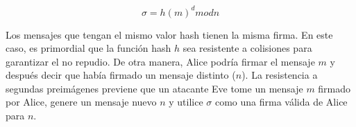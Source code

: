 \begin{equation}
  \label{funcion_hash_sign}
 	\sigma = h(m)^d mod n
\end{equation}

Los mensajes que tengan el mismo valor hash tienen la misma firma. En este
caso, es primordial que la función hash $h$ sea resistente a colisiones
para garantizar el no repudio. De otra manera, Alice podría firmar el
mensaje $m$ y después decir que había firmado un mensaje distinto ($n$).
La resistencia a segundas preimágenes previene que un atacante Eve tome un
mensaje $m$ firmado por Alice, genere un mensaje nuevo $n$ y utilice
$\sigma$ como una firma válida de Alice para $n$.
